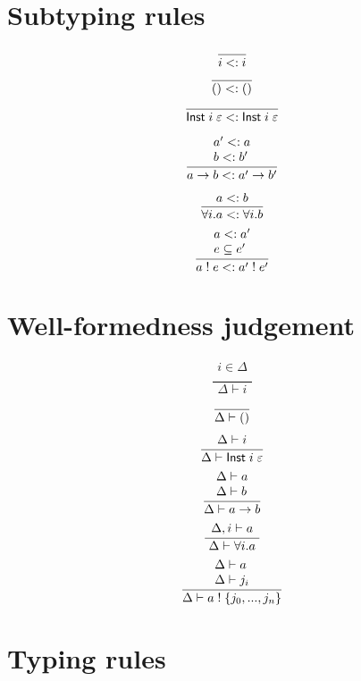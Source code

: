 \newpage
\section{Subtyping rules}

\[
\frac{
}{
	i <: i
}
\]
\[
\frac{
}{
	() <: ()
}
\]
\[
\frac{
}{
	\mathsf{Inst} \; i \; \varepsilon <: \mathsf{Inst} \; i \; \varepsilon
}
\]

\[
\frac{
	\begin{array}{l}
	a' <: a \\
	b <: b'
	\end{array}
}{
	a \rightarrow b <: a' \rightarrow b'
}
\]

\[
\frac{
	a <: b
}{
	\forall i . a <: \forall i . b
}
\]
\[
\frac{
	\begin{array}{l}
	a <: a' \\
	e \subseteq e'
	\end{array}
}{
	a \; ! \; e <: a' \; ! \; e'
}
\]

\section{Well-formedness judgement}

\[\frac{
	\begin{array}{l}
	i \in \Delta \\
	\end{array}
}{
	\Delta \vdash i
}\]
\[\frac{
	\begin{array}{l}
	\end{array}
}{
	\Delta \vdash ()
}\]
\[\frac{
	\begin{array}{l}
	\Delta \vdash i
	\end{array}
}{
	\Delta \vdash \mathsf{Inst} \; i \; \varepsilon
}\]
\[\frac{
	\begin{array}{l}
	\Delta \vdash a  \\
	\Delta \vdash b
	\end{array}
}{
	\Delta \vdash a \rightarrow b
}\]
\[\frac{
	\begin{array}{l}
	\Delta , i \vdash a  \\
	\end{array}
}{
	\Delta \vdash \forall i . a
}\]
\[\frac{
	\begin{array}{l}
	\Delta \vdash a  \\
	\Delta \vdash j_i
	\end{array}
}{
	\Delta \vdash a \; ! \; \{ j_0, ..., j_n \}
}\]

\section{Typing rules}


